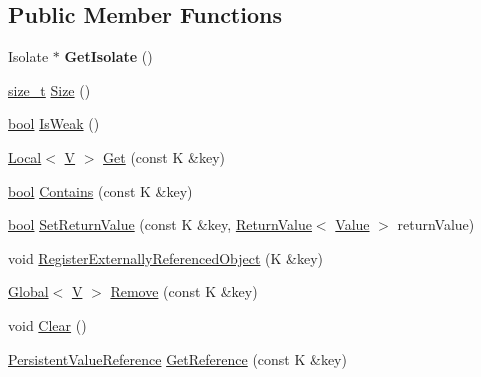 \subsection*{Public Member Functions}
\begin{DoxyCompactItemize}
\item 
\mbox{\label{classv8_1_1PersistentValueMapBase_a80da7adc6e8bdb166912075346116978}} 
Isolate $\ast$ {\bfseries Get\+Isolate} ()
\item 
\mbox{\hyperlink{classsize__t}{size\+\_\+t}} \mbox{\hyperlink{classv8_1_1PersistentValueMapBase_ade5c5db2a968fdabe073649e85b837eb}{Size}} ()
\item 
\mbox{\hyperlink{classbool}{bool}} \mbox{\hyperlink{classv8_1_1PersistentValueMapBase_a9f824b13dd30605589508db2740dd678}{Is\+Weak}} ()
\item 
\mbox{\hyperlink{classv8_1_1Local}{Local}}$<$ \mbox{\hyperlink{classV}{V}} $>$ \mbox{\hyperlink{classv8_1_1PersistentValueMapBase_a16b8f906ea42036c2f37d44813bf2a72}{Get}} (const K \&key)
\item 
\mbox{\hyperlink{classbool}{bool}} \mbox{\hyperlink{classv8_1_1PersistentValueMapBase_a8c68e5f99c4042541c6d32232c97282a}{Contains}} (const K \&key)
\item 
\mbox{\hyperlink{classbool}{bool}} \mbox{\hyperlink{classv8_1_1PersistentValueMapBase_a85201649d2bbd0ffdebe8be3d5c6447a}{Set\+Return\+Value}} (const K \&key, \mbox{\hyperlink{classv8_1_1ReturnValue}{Return\+Value}}$<$ \mbox{\hyperlink{classv8_1_1Value}{Value}} $>$ return\+Value)
\item 
void \mbox{\hyperlink{classv8_1_1PersistentValueMapBase_a7d1cd63172b997dfaac9d0f009edd709}{Register\+Externally\+Referenced\+Object}} (K \&key)
\item 
\mbox{\hyperlink{classv8_1_1Global}{Global}}$<$ \mbox{\hyperlink{classV}{V}} $>$ \mbox{\hyperlink{classv8_1_1PersistentValueMapBase_abd75a4c050416712167ba0bb9eace097}{Remove}} (const K \&key)
\item 
void \mbox{\hyperlink{classv8_1_1PersistentValueMapBase_a1bf074e7a7c24713c9a3d40ddce89e74}{Clear}} ()
\item 
\mbox{\hyperlink{classv8_1_1PersistentValueMapBase_1_1PersistentValueReference}{Persistent\+Value\+Reference}} \mbox{\hyperlink{classv8_1_1PersistentValueMapBase_a52e74c69b94c7ce77a65af9f32d68af4}{Get\+Reference}} (const K \&key)
\end{DoxyCompactItemize}
